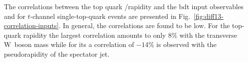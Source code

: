 {
\hspace{0.02\textwidth}
}

The correlations between the top quark \pt/rapidity and the \gls{bdt} input observables and for $t$-channel single-top-quark events are presented in Fig.~\ref{fig:diff13-correlation-inputs}. In general, the correlations are found to be low. For the top-quark rapidity the largest correlation amounts to only $8\%$ with the transverse W~boson mass while for its \pt a correlation of $-14\%$ is observed with the pseudorapidity of the spectator jet.



